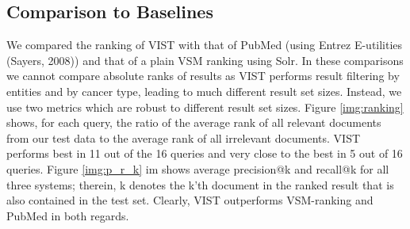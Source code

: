 \documentclass[fleqn,10pt]{wlscirep}
\begin{document}
\subsection*{Comparison to Baselines}
We compared the ranking of VIST with that of PubMed (using Entrez E-utilities (Sayers, 2008)) and that of a plain VSM ranking using Solr. In these comparisons we cannot compare absolute ranks of results as VIST performs result filtering by entities and by cancer type, leading to much different result set sizes. Instead, we use two metrics which are robust to different result set sizes. Figure \ref{img:ranking} shows, for each query, the ratio of the average rank of all relevant documents from our test data to the average rank of all irrelevant documents. VIST performs best in 11 out of the 16 queries and very close to the best in 5 out of 16 queries. Figure \ref{img:p_r_k} im shows average precision@k and recall@k for all three systems; therein, k denotes the k’th document in the ranked result that is also contained in the test set. Clearly, VIST outperforms VSM-ranking and PubMed in both regards.
\end{document}
